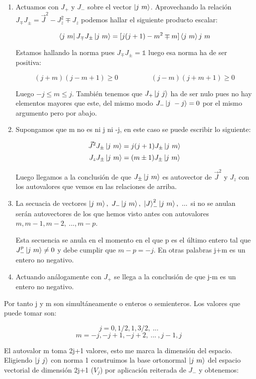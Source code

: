 \documentclass{article}
\begin{document}
\begin{enumerate}
\item Actuamos con $J_+$ y $J_-$ sobre el vector $\ket{j \ m}$. Aprovechando la relación $J_\mp J_\pm =\Vec{J}^2- J_z^2 \mp J_z$ podemos hallar el siguiente producto escalar:

$$\bra{ j \ m} J_\mp J_\pm  \ket{j \ m}= [j(j+1) - m^2 \mp m]\braket{j \ m}{j \ m}$$

Estamos hallando la norma pues $J_\mp J_\pm =\mathds{1}$ luego esa norma ha de ser positiva:

$$(j+m)(j-m+1) \geq 0 \hspace{2cm} (j-m)(j+m +1) \geq 0$$

Luego $-j \leq m \leq j$. También tenemos que $J_+ \ket{j \ j}$ ha de ser nulo pues no hay elementos mayores que este, del mismo modo $J_- \ket{j \ -j}=0$ por el mismo argumento pero por abajo.

\item Supongamos que m no es ni j ni -j, en este caso se puede escribir lo siguiente:

$$\Vec{J}^2J_\pm \ket{j \ m} =j(j+1) J_\pm \ket{j \ m}$$
$$J_z J_\pm \ket{ j \ m}= (m\pm 1)J_\pm \ket{j \ m}$$

Luego llegamos a la conclusión de que $J_\pm \ket{j \ m}$ es autovector de $\Vec{J}^2$ y $J_z$ con los autovalores que vemos en las relaciones de arriba.

\item La secuacia de vectores $\ket{j \ m}, \ J_- \ket{j \ m}, \ \ket{J}_-^2 \ket{j \ m}, \ ...$ si no se anulan serán autovectores de los que hemos visto antes con autovalores $m, m-1, m-2, \ ..., m-p$.

Esta secuencia se anula en el momento en el que p es el último entero tal que $J_-^p \ket{ j \ m} \neq 0$ y debe cumplir que $m-p=-j$. En otras palabras j+m es un entero no negativo.

\item Actuando análogamente con $J_+$ se llega a la conclusión de que j-m es un entero no negativo.
\end{enumerate}

Por tanto j y m son simultáneamente o enteros o semienteros. Los valores que puede tomar son:

$$j=0,1/2,1,3/2, \ ...$$
$$m=-j,-j+1,-j+2, \ ... \ , j-1, j$$

El autovalor m toma 2j+1 valores, esto me marca la dimensión del espacio. Eligiendo $\ket{ j \ j}$ con norma 1 construimos la base ortonormal $\ket{j \ m}$ del espacio vectorial de dimensión 2j+1 ($V_j$) por aplicación reiterada de $J_-$ y obtenemos:
\end{document}
